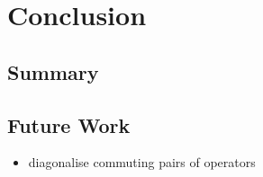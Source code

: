 \chapter{Conclusion}%
\label{conclusion}

\section{Summary}

\section{Future Work}

\begin{itemize}
    \item diagonalise commuting pairs of operators
\end{itemize}

